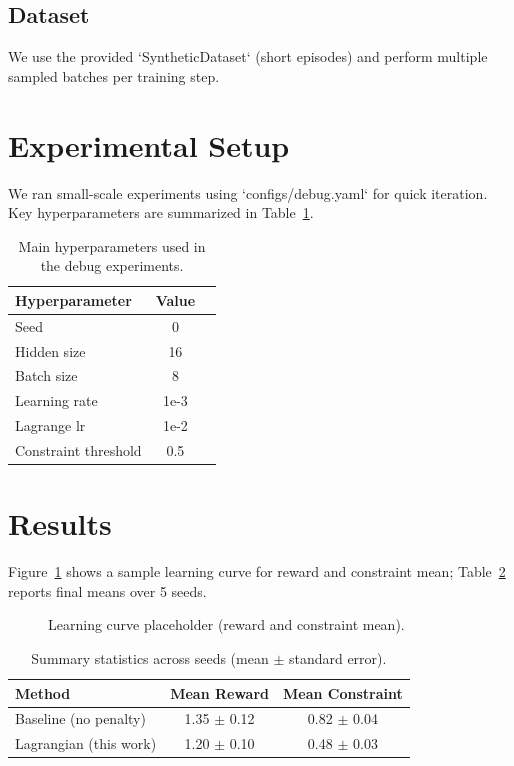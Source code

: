 \documentclass[11pt]{article}
\begin{document}
\subsection{Dataset}
We use the provided `SyntheticDataset` (short episodes) and perform multiple sampled batches per training step.

\section{Experimental Setup}
We ran small-scale experiments using `configs/debug.yaml` for quick iteration. Key hyperparameters are summarized in Table~\ref{tab:hyper}.

\begin{table}[ht]
\centering
\begin{tabular}{lcc}
\toprule
Hyperparameter & Value \\\midrule
Seed & 0 \\
Hidden size & 16 \\
Batch size & 8 \\
Learning rate & 1e-3 \\
Lagrange lr & 1e-2 \\
Constraint threshold & 0.5 \\
\bottomrule
\end{tabular}
\caption{Main hyperparameters used in the debug experiments.}
\label{tab:hyper}
\end{table}

\section{Results}
Figure~\ref{fig:reward} shows a sample learning curve for reward and constraint mean; Table~\ref{tab:results} reports final means over 5 seeds.

\begin{figure}[ht]
  \centering
  \caption{Learning curve placeholder (reward and constraint mean).}
  \label{fig:reward}
\end{figure}

\begin{table}[ht]
\centering
\begin{tabular}{lcc}
\toprule
Method & Mean Reward & Mean Constraint \\\midrule
Baseline (no penalty) & 1.35 $\pm$ 0.12 & 0.82 $\pm$ 0.04 \\
Lagrangian (this work) & 1.20 $\pm$ 0.10 & 0.48 $\pm$ 0.03 \\
\bottomrule
\end{tabular}
\caption{Summary statistics across seeds (mean $\pm$ standard error).}
\label{tab:results}
\end{table}
\end{document}
